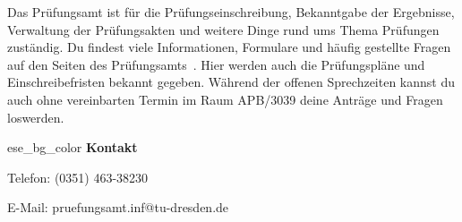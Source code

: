 \label{sec:pruefungsamt}
Das Prüfungsamt ist für die Prüfungseinschreibung, Bekanntgabe der Ergebnisse, Verwaltung der Prüfungsakten und weitere Dinge rund ums Thema Prüfungen zuständig.
Du findest viele Informationen, Formulare und häufig gestellte Fragen auf den Seiten des Prüfungsamts~. Hier werden auch die Prüfungspläne und Einschreibefristen bekannt gegeben.
Während der offenen Sprechzeiten kannst du auch ohne vereinbarten Termin im Raum APB/3039 deine Anträge und Fragen loswerden.

\begin{awesomeblock}{2pt}{\faEnvelope[regular]}{ese_bg_color}
    \textbf{Kontakt}

	Telefon: (0351) 463-38230
	
	E-Mail: pruefungsamt.inf@tu-dresden.de
\end{awesomeblock}

